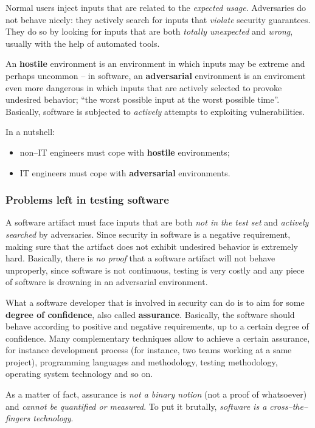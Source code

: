 \documentclass[10pt]{extbook}
\begin{document}
Normal users inject inputs that are related to the \emph{expected usage}.
Adversaries do not behave nicely: they actively search for inputs that
\emph{violate} security guarantees. They do so by looking for inputs that are
both \emph{totally unexpected} and \emph{wrong}, usually with the help of
automated tools.

An \textbf{hostile} environment is an environment in which inputs may be
extreme and perhaps uncommon -- in software, an \textbf{adversarial}
environment is an enviroment even more dangerous in which inputs that are
actively selected to provoke undesired behavior; ``the worst possible input at
the worst possible time''. Basically, software is subjected to \emph{actively}
attempts to exploiting vulnerabilities.

In a nutshell:
\begin{itemize}
    \item non--IT engineers must cope with \textbf{hostile} environments;
    \item IT engineers must cope with \textbf{adversarial} environments.
\end{itemize}

\subsubsection{Problems left in testing software}

A software artifact must face inputs that are both \emph{not in the test set}
and \emph{actively searched} by adversaries. Since security in software is a
negative requirement, making sure that the artifact does not exhibit undesired
behavior is extremely hard. Basically, there is \emph{no proof} that a software
artifact will not behave unproperly, since software is not continuous, testing
is very costly and any piece of software is drowning in an adversarial
environment.

What a software developer that is involved in security can do is to aim for
some \textbf{degree of confidence}, also called \textbf{assurance}. Basically,
the software should behave according to positive and negative requirements, up
to a certain degree of confidence. Many complementary techniques allow to
achieve a certain assurance, for instance development process (for instance,
two teams working at a same project), programming languages and methodology,
testing methodology, operating system technology and so on.

As a matter of fact, assurance is \emph{not a binary notion} (not a proof of
whatsoever) and \emph{cannot be quantified or measured}. To put it brutally,
\emph{software is a cross--the--fingers technology}.
\end{document}
